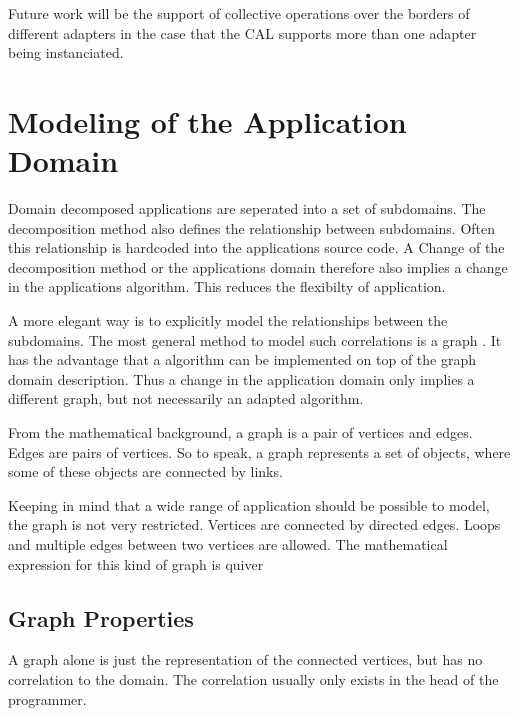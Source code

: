 Future work will be the support of collective operations over the borders
of different adapters in the case that the CAL supports more than one adapter
being instanciated.


\section{Modeling of the Application Domain}
Domain decomposed applications are seperated into a set of
subdomains. The decomposition method also defines the relationship
between subdomains. Often this relationship is hardcoded into the
applications source code. A Change of the decomposition method or the
applications domain therefore also implies a change in the
applications algorithm. This reduces the flexibilty of application.

A more elegant way is to explicitly model the relationships between
the subdomains. The most general method to model such correlations is
a graph \cite{ref:graph}. It has the advantage that a algorithm can
be implemented on top of the graph domain description. Thus a change
in the application domain only implies a different graph, but not
necessarily an adapted algorithm.

From the mathematical background, a graph is a pair of vertices and
edges. Edges are pairs of vertices. So to speak, a graph represents a
set of objects, where some of these objects are connected by links.

Keeping in mind that a wide range of application should be possible to
model, the graph is not very restricted. Vertices are connected by
directed edges. Loops and multiple edges between two vertices are
allowed. The mathematical expression for this kind of graph is quiver
\cite{ref:quiver}

\subsection{Graph Properties}
A graph alone is just the representation of the connected vertices,
but has no correlation to the domain. The correlation usually only
exists in the head of the programmer.

